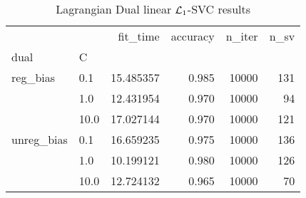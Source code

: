 \begin{table}[H]
\centering
\caption{Lagrangian Dual linear $\protect \mathcal{L}_1$-SVC results}
\label{linear_lagrangian_dual_l1_svc_cv_results}
\begin{tabular}{llrrrr}
\toprule
           &      &   fit\_time &  accuracy &  n\_iter &  n\_sv \\
dual & C &            &           &         &       \\
\midrule
reg\_bias & 0.1  &  15.485357 &     0.985 &   10000 &   131 \\
           & 1.0  &  12.431954 &     0.970 &   10000 &    94 \\
           & 10.0 &  17.027144 &     0.970 &   10000 &   121 \\
unreg\_bias & 0.1  &  16.659235 &     0.975 &   10000 &   136 \\
           & 1.0  &  10.199121 &     0.980 &   10000 &   126 \\
           & 10.0 &  12.724132 &     0.965 &   10000 &    70 \\
\bottomrule
\end{tabular}
\end{table}
